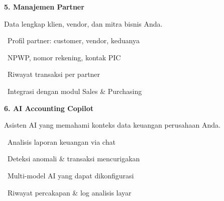 \documentclass[a4paper]{article}
\begin{document}
\noindent
\begin{minipage}[t]{0.485\textwidth}
    \colorbox{BlueDark}{%
        \begin{minipage}{\dimexpr\textwidth-2\fboxsep\relax}
            {\fontsize{10}{13}\selectfont\bfseries\color{White} 5. Manajemen Partner}
        \end{minipage}}\par
    \vspace{4pt}
    {\fontsize{9}{12}\selectfont\color{TextDark}%
    Data lengkap klien, vendor, dan mitra bisnis Anda.\par\vspace{3pt}
    \textbullet\ Profil partner: customer, vendor, keduanya\par\vspace{2pt}%
    \textbullet\ NPWP, nomor rekening, kontak PIC\par\vspace{2pt}%
    \textbullet\ Riwayat transaksi per partner\par\vspace{2pt}%
    \textbullet\ Integrasi dengan modul Sales \& Purchasing}%
\end{minipage}%
\hfill
\begin{minipage}[t]{0.485\textwidth}
    \colorbox{OrangePrimary}{%
        \begin{minipage}{\dimexpr\textwidth-2\fboxsep\relax}
            {\fontsize{10}{13}\selectfont\bfseries\color{White} 6. AI Accounting Copilot}
        \end{minipage}}\par
    \vspace{4pt}
    {\fontsize{9}{12}\selectfont\color{TextDark}%
    Asisten AI yang memahami konteks data keuangan perusahaan Anda.\par\vspace{3pt}
    \textbullet\ Analisis laporan keuangan via chat\par\vspace{2pt}%
    \textbullet\ Deteksi anomali \& transaksi mencurigakan\par\vspace{2pt}%
    \textbullet\ Multi-model AI yang dapat dikonfigurasi\par\vspace{2pt}%
    \textbullet\ Riwayat percakapan \& log analisis layar}%
\end{minipage}

\vspace{8pt}
\end{document}
